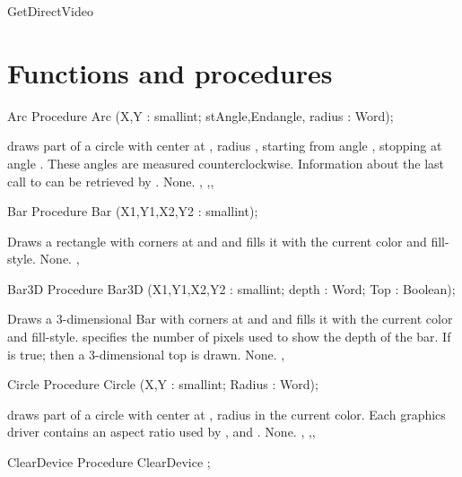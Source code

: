 \begin{function}{GetDirectVideo}
\section{Functions and procedures}


\begin{procedure}{Arc}
\Declaration
Procedure Arc (X,Y : smallint; stAngle,Endangle, radius : Word);

\Description
  draws part of a circle with center at , radius
, starting from angle , stopping at angle .
These  angles are measured counterclockwise. Information about the last call
to  can be retrieved by .
\Errors
None.
\SeeAlso
{},
,, 
\end{procedure}

\begin{procedure}{Bar}
\Declaration
Procedure Bar (X1,Y1,X2,Y2 : smallint);

\Description
Draws a rectangle with corners at  and 
and fills it with the current color and fill-style.
\Errors
None.
\SeeAlso
{},
\end{procedure}

\begin{procedure}{Bar3D}
\Declaration
Procedure Bar3D (X1,Y1,X2,Y2 : smallint; depth : Word; Top : Boolean);

\Description
Draws a 3-dimensional Bar  with corners at  and 
and fills it with the current color and fill-style.
 specifies the number of pixels used to show the depth of the
bar.
If  is true; then a 3-dimensional top is drawn.
\Errors
None.
\SeeAlso
{}, 
\end{procedure}

\begin{procedure}{Circle}
\Declaration
Procedure Circle (X,Y : smallint; Radius : Word);

\Description
  draws part of a circle with center at , radius
 in the current color. Each graphics driver contains an
aspect ratio used by ,  and .
\Errors
None.
\SeeAlso
{},
,, 
\end{procedure}

\begin{procedure}{ClearDevice}
\Declaration
Procedure ClearDevice ;


\end{procedure}
\end{function}

